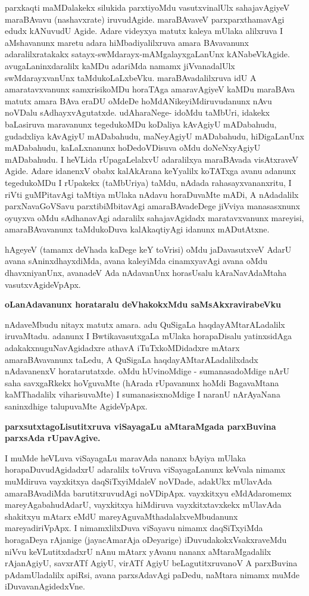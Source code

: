 \noindent
parxkaqti maMDalakekx silukida parxtiyoMdu vasutxvinalUlx sahajavAgiyeV maraBAvavu (nashavxrate) iru\-vudAgide. maraBAvaveV parxparxthamavAgi edudx kANuvudU Agide. Adare videyxya matutx kaleya mU\-laka alilx\-ruva I aMshavanunx maretu adara hiMbadi\-yalilxruva amara BAvavanunx adaralilxratakakx satayx\--swMdarayx-mAMgalayx\break\-gaLanUnx kANabeVkAgide. avugaLaninxdaralilx kaMDu adariMda namamx jiVvanadalUlx swMdarayx\-vanUnx taMdukoLaLxbeVku. maraBAvadalilxruva idU A amaratavxvanunx samxrisikoMDu hora\-TAga amaravAgiyeV kaMDu maraBAva matutx amara BAva eraDU oMdeDe hoMdANikeyiMdiruvu\-danunx nAvu noVDalu sAdhayxvAgutatxde. udAharaNege- idoMdu taMbUri, idakekx baLasiruva mara\-vanunx tegedukoMDu koDaliya kAvAgiyU mADabahudu, gudadxliya kAvAgiyU mADabahudu, maNeyAgiyU mADabahudu, hiDigaLanUnx mADabahudu, kaLaLxnanunx hoDe\-doVDisuva oMdu doNeNx\-yAgiyU mADabahudu. I heVLida rUpagaLelalxvU adaralilxya maraBAvada visAtxraveV Agide. Adare idanenxV obabx kalAkArana keYyalilx koTATxga avanu adanunx tegedukoMDu I rUpakekx (taMbU\-riya) taMdu, nAdada rahasayxvananxritu, I riVti guMPitavAgi taMtiya mUlaka nAdavu horaDuvaMte mADi, A nAdadalilx parxNavaGoVSavu parxtibiMbitavAgi amaraBAvadeDege jiVviya manasasxnunx oyuyxva oMdu sAdhanavAgi adaralilx sahajavAgidadx maratavxvanunx mareyisi, amaraBAvavanunx taMdukoDuva kalAkaqtiyAgi idanunx mADutAtxne. 

hAgeyeV (tamamx deVhada kaDege keY toVrisi) oMdu jaDavasutxveV AdarU avana sAninxdhayxdiMda, avana kaleyiMda cinamxyavAgi avana oMdu dhavxniyanUnx, avanadeV Ada nAdavanUnx horasUsalu kAraNavAdaMtaha vasutxvAgideVpApx.

{\bigskip
\noindent
{\large\bf oLanAdavanunx horataralu deVhakokxMdu saMsAkxravirabeVku}}\label{page130}
\medskip

\noindent
nAdaveMbudu nitayx matutx amara. adu QuSigaLa haqdayAMtarALadalilx iruvaMtadu. adanunx I BwtikavasutxgaLa mUlaka horapaDisalu yatinxsidAga adakakxnuguNavAgidadxre athavA iTuTxkoMDi\-dadxre mAtarx amaraBAvavanunx taLedu, A QuSigaLa haqdayAMtarALadalilxdadx nAdavanenxV horatarutatxde. oMdu hUvinoMdige - sumanasadoMdige nArU saha savxgaRkekx hoVguvaMte (hArada rUpavanunx hoMdi BagavaMtana kaMThadalilx viharisuvaMte) I sumanasisxnoMdige I naranU nArAyaNana saninxdhige talupu\-vaMte AgideVpApx.

\newpage

{\bigskip
\noindent
{\large\bf parxsutxtagoLisutitxruva viSayagaLu aMtaraMgada parxBuvina parxsAda rUpa\-vAgive.}}
\medskip

\noindent
I muMde heVLuva viSayagaLu maravAda nananx bAyiya mUlaka hora\-paDuvudAgidadxrU adaralilx toVruva viSayagaLanunx keVvala nimamx muMdiruva \hbox{vayxkitxya} daqSiTxyiMdaleV noVDade, adakUkx mUlavAda amaraBAvadiMda baru\-titxruvudAgi noVDipApx. vayxkitxyu eMdAdaromemx mareyAgabahu\-dAdarU, vayxkitxya hiMdiruva vayxkitxtavxkekx mUlavAda shakitxyu mAtarx eMdU mareyAguvaMthadalalxveMbu\-danunx mareyadiriVpApx. I nimamxlilxDuva viSayavu nimamx daqSiTxyiMda horagaDeya rAjanige (jayacAmarAja oDeyarige) iDuvuda\-kokxVsakxraveMdu niVvu keVLutitxdadxrU nAnu mAtarx yAvanu nananx aMtaraMgadalilx rAja\-nAgiyU, savxrATf AgiyU, virATf AgiyU beLagutitxruvanoV A parxBuvina pAdamUladalilx apiRsi, avana parxsAda\-vAgi paDedu, naMtara nimamx muMde iDuvavanAgidedxVne.

